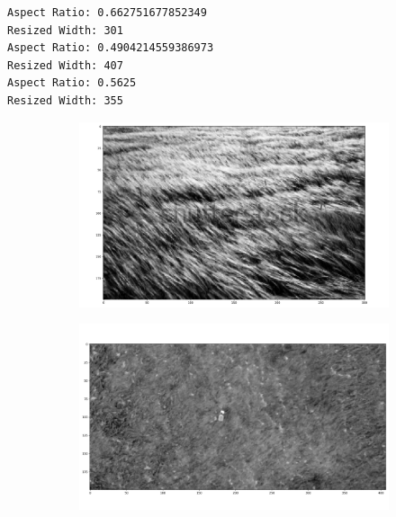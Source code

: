 \documentclass[
  letterpaper,
  DIV=11,
  numbers=noendperiod]{scrreprt}
\begin{document}
\begin{verbatim}
Aspect Ratio: 0.662751677852349
Resized Width: 301
Aspect Ratio: 0.4904214559386973
Resized Width: 407
Aspect Ratio: 0.5625
Resized Width: 355
\end{verbatim}

\begin{figure}

\begin{minipage}{0.33\linewidth}

\begin{figure}[H]

{\centering \includegraphics{images/plots/grass/0.jpg}

}


\end{figure}%

\end{minipage}%
%
\begin{minipage}{0.33\linewidth}

\begin{figure}[H]

{\centering \includegraphics{images/plots/grass/1.jpg}

}
\end{figure}
\end{minipage}
\end{figure}
\end{document}

